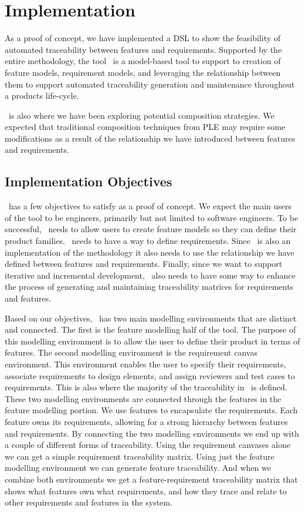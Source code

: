 \chapter{Implementation}

As a proof of concept, we have implemented a \ac{DSL} to show the feasibility of automated traceability between features and requirements. Supported by the entire methodology, the tool \tool\ is a model-based tool to support to creation of feature models, requirement models, and leveraging the relationship between them to support automated traceability generation and maintenance throughout a products life-cycle.

\tool\ is also where we have been exploring potential composition strategies. We expected that traditional composition techniques from \ac{PLE} may require some modifications as a result of the relationship we have introduced between features and requirements. 

\section{Implementation Objectives}

\tool\ has a few objectives to satisfy as a proof of concept. We expect the main users of the tool to be engineers, primarily but not limited to software engineers. To be successful, \tool\ needs to allow users to create feature models so they can define their product families. \tool\ needs to have a way to define requirements. Since \tool\ is also an implementation of the methodology it also needs to use the relationship we have defined between features and requirements. Finally, since we want to support iterative and incremental development, \tool\ also needs to have some way to enhance the process of generating and maintaining traceability matrices for requirements and features. 

Based on our objectives, \tool\ has two main modelling environments that are distinct and connected. The first is the feature modelling half of the tool. The purpose of this modelling environment is to allow the user to define their product in terms of features. The second modelling environment is the requirement canvas environment. This environment enables the user to specify their requirements, associate requirements to design elements, and assign reviewers and test cases to requirements. This is also where the majority of the traceability in \tool\ is defined. These two modelling environments are connected through the features in the feature modelling portion. We use features to encapsulate the requirements. Each feature owns its requirements, allowing for a strong hierarchy between features and requirements. By connecting the two modelling environments we end up with a couple of different forms of traceability. Using the requirement canvases alone we can get a simple requirement traceability matrix. Using just the feature modelling environment we can generate feature traceability. And when we combine both environments we get a feature-requirement traceability matrix that shows what features own what requirements, and how they trace and relate to other requirements and features in the system. 

